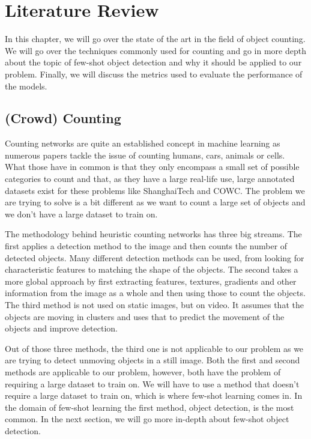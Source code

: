 
\chapter{Literature Review}
In this chapter, we will go over the state of the art in the field of object counting. We will go over the techniques commonly used for counting and go in more depth about the topic of few-shot object detection and why it should be applied to our problem. Finally, we will discuss the metrics used to evaluate the performance of the models.

\section{(Crowd) Counting}
Counting networks are quite an established concept in machine learning as numerous papers tackle the issue of counting humans, cars, animals or cells. What those have in common is that they only encompass a small set of possible categories to count and that, as they have a large real-life use, large annotated datasets exist for these problems like ShanghaiTech and COWC. The problem we are trying to solve is a bit different as we want to count a large set of objects and we don't have a large dataset to train on.

The methodology behind heuristic counting networks has three big streams\cite{s22145286}. The first applies a detection method to the image and then counts the number of detected objects. Many different detection methods can be used, from looking for characteristic features to matching the shape of the objects. The second takes a more global approach by first extracting features, textures, gradients and other information from the image as a whole and then using those to count the objects. The third method is not used on static images, but on video. It assumes that the objects are moving in clusters and uses that to predict the movement of the objects and improve detection.

Out of those three methods, the third one is not applicable to our problem as we are trying to detect unmoving objects in a still image.
Both the first and second methods are applicable to our problem, however, both have the problem of requiring a large dataset to train on. We will have to use a method that doesn't require a large dataset to train on, which is where few-shot learning comes in. In the domain of few-shot learning the first method, object detection, is the most common. In the next section, we will go more in-depth about few-shot object detection. %

